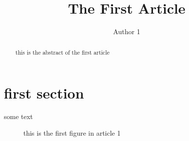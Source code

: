 \documentclass[a4paper]{article}
\title{The First Article}
\author{Author 1}
\date{}
\begin{document}
	
	\maketitle
	
	\begin{abstract}
		this is the abstract of the first article
	\end{abstract}
	
	\section{first section}
	some text
	
	\begin{figure}
		\caption{this is the first figure in article 1}
	\end{figure}
	
\end{document}
